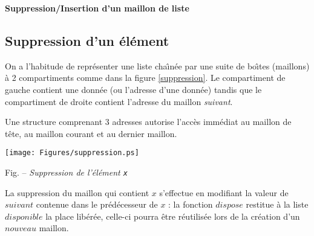 \centerline{\Large\bf Suppression/Insertion d'un maillon de liste}
 
 \noindent\hrulefill  
\begin{multicols}{2}


%	
%
%
\subsection*{Suppression d'un \'el\'ement}



On a l'habitude de repr\'esenter une liste cha\^\i n\'ee par une suite de bo\^\i tes
(maillons) \`a 2 compartiments comme dans la figure \ref{suppression}.
Le compartiment de gauche contient
une donn\'ee (ou l'adresse d'une donn\'ee) tandis que le compartiment de droite
contient l'adresse du maillon {\it suivant}. 

Une structure comprenant 3 adresses autorise l'acc\`es imm\'ediat au maillon de
t\^ete, au maillon courant et au dernier maillon. 

\begin{figurette}
        \texttt{[image: Figures/suppression.ps]}
	\label{suppression}
\medskip
\centerline{{\sc Fig.} \thesubsection -- {\it Suppression de l'\'el\'ement {\tt x}}}
\end{figurette}


La suppression du maillon qui contient $x$ s'effectue en modifiant la
valeur de $suivant$ contenue dans le pr\'ed\'ecesseur de $x$ : la fonction
$dispose$ restitue \`a la liste $disponible$ la place lib\'er\'ee, celle-ci pourra
\^etre r\'eutilis\'ee lors de la cr\'eation d'un $nouveau$ maillon.


\end{multicols}

